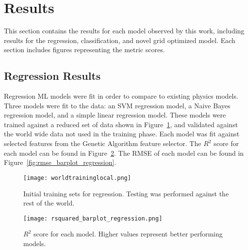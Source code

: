 \section{Results}
\setlength{\parindent}{10ex}

This section contains the results for each model observed by this work, including results for the regression, classification, and novel grid optimized model.
Each section includes figures representing the metric scores.

\subsection{Regression Results}
Regression \ac{ML} models were fit in order to compare to existing physics models.
Three models were fit to the data: 
an SVM regression model, a Naive Bayes regression model, and a simple linear regression model.
These models were trained against a reduced set of data shown in Figure~\ref{fig:trainset}, and validated against the world wide data not used in the training phase.
Each model was fit against selected features from the Genetic Algorithm feature selector.
The \(R^2\) score for each model can be found in Figure~\ref{fig:r2_barplot_regression}.
The RMSE of each model can be found in Figure~\ref{fig:rmse_barplot_regression}.



\begin{figure}[htp]
    \centering
    \texttt{[image: worldtraininglocal.png]}
    \caption{Initial training sets for regression. Testing was performed against the rest of the world.}
    \label{fig:trainset}
\end{figure}


\begin{figure}[htp]
    \centering
    \texttt{[image: rsquared\_barplot\_regression.png]}
    \caption{\(R^2\) score for each model. Higher values represent better performing models.}
    \label{fig:r2_barplot_regression}
\end{figure}

